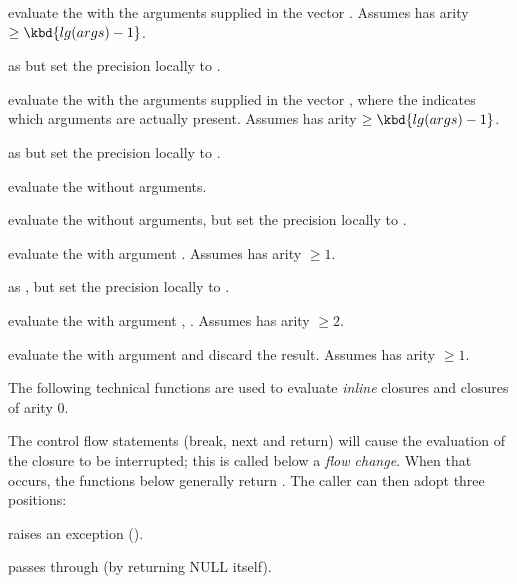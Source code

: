  evaluate the 
 with the arguments supplied in the vector . Assumes 
has arity $\geq \kbd{lg(args)-1}$.

 as
 but set the precision locally to .

 evaluate the 
 with the arguments supplied in the vector , where the 
 indicates which arguments are actually present.
Assumes  has arity $\geq \kbd{lg(args)-1}$.

 as
 but set the precision locally to .

 evaluate the 
 without arguments.

 evaluate the 
 without arguments, but set the precision locally to .

 evaluate the 
 with argument . Assumes  has arity $\geq 1$.

 as
, but set the precision locally to .

 evaluate the 
 with argument , . Assumes  has arity $\geq 2$.

 evaluate the 
 with argument  and discard the result. Assumes 
has arity $\geq 1$.

The following technical functions are used to evaluate \emph{inline}
closures and closures of arity 0.

The control flow statements (break, next and return) will cause the
evaluation of the closure to be interrupted; this is called below a
\emph{flow change}. When that occurs, the functions below generally
 return . The caller can then adopt three positions:

\item raises an exception ().

\item passes through (by returning NULL itself).

